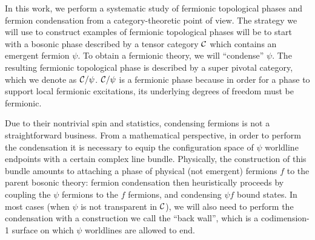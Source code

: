 In this work, we perform a systematic study of fermionic topological phases and fermion condensation from a category-theoretic point of view. 
The strategy we will use to construct examples of fermionic topological phases will be to start with 
a bosonic phase described by a tensor category $\mathcal{C}$
which contains an emergent fermion $\psi$.
To obtain a fermionic theory, we will ``condense'' $\psi$.
The resulting fermionic topological phase is described by a super pivotal category, which we denote
as $\mathcal{C} / \psi$.
$\mathcal{C}/\psi$ is a fermionic phase because in order for a phase to support local fermionic excitations, 
its underlying degrees of freedom must be fermionic. 

Due to their nontrivial spin and statistics, condensing fermions is not a straightforward business. 
From a mathematical perspective, in order to perform the condensation it is necessary to equip the configuration 
space of $\psi$ worldline endpoints with a certain complex line bundle. 
Physically, the construction of this bundle amounts to attaching a phase of physical (not emergent) fermions $f$ 
to the parent bosonic theory: 
fermion condensation then heuristically proceeds by coupling the $\psi$ fermions to 
the $f$ fermions, and condensing $\psi f$ bound states. 
In most cases (when $\psi$ is not transparent in $\mathcal{C}$), we will also need to perform 
the condensation with a construction we call the ``back wall'', which is a codimension-1 surface 
on which $\psi$ worldlines are allowed to end. 


